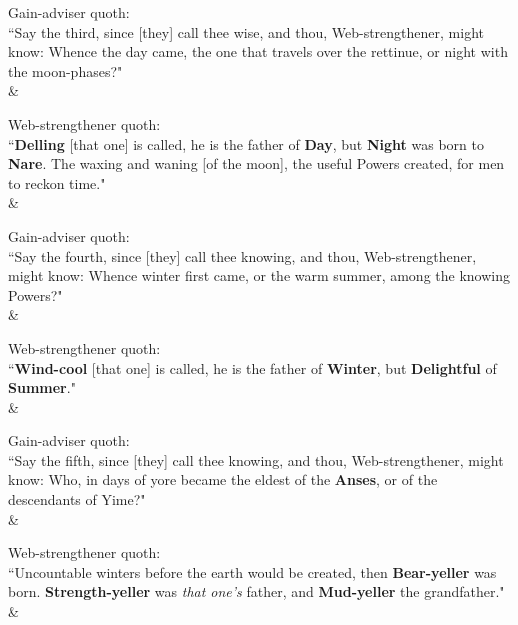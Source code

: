 \begin{Rightside}
\begin{astanza}%
\bv Gain-adviser quoth: \\ “Say the third, since [they] call thee wise, and thou, Web-strengthener, might know: Whence the day came, the one that travels over the rettinue, or night with the moon-phases?" \\
\&\end{astanza}%

\begin{astanza}%
\bv Web-strengthener quoth: \\ “\textbf{Delling} [that one] is called, he is the father of \textbf{Day}, but \textbf{Night} was born to \textbf{Nare}. The waxing and waning [of the moon], the useful Powers created, for men to reckon time." \\
\&\end{astanza}%

\begin{astanza}%
\bv Gain-adviser quoth: \\ “Say the fourth, since [they] call thee knowing, and thou, Web-strengthener, might know: Whence winter first came, or the warm summer, among the knowing Powers?" \\
\&\end{astanza}%

\begin{astanza}%
\bv Web-strengthener quoth: \\ “\textbf{Wind-cool} [that one] is called, he is the father of \textbf{Winter}, but \textbf{Delightful} of \textbf{Summer}." \\
\&\end{astanza}%

\begin{astanza}%
\bv Gain-adviser quoth: \\ “Say the fifth, since [they] call thee knowing, and thou, Web-strengthener, might know: Who, in days of yore became the eldest of the \textbf{Anses}, or of the descendants of Yime?" \\
\&\end{astanza}%

\begin{astanza}%
\bv Web-strengthener quoth: \\ “Uncountable winters before the earth would be created, then \textbf{Bear-yeller} was born. \textbf{Strength-yeller} was \emph{that one's} father, and \textbf{Mud-yeller} the grandfather." \\
\&\end{astanza}%


\end{Rightside}
